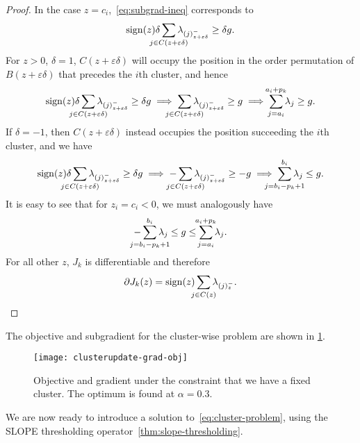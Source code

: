\begin{proof}
  In the case \(z = c_i\),~\eqref{eq:subgrad-ineq} corresponds to
  \begin{equation}
    \label{eq:subgrad-ineq-nonzero}
    \sign(z)\delta \smashoperator{\sum_{j \in C(z + \varepsilon\delta)}} \lambda_{(j)^-_{z + \varepsilon\delta}} \geq \delta g.
  \end{equation}
  For \(z > 0\), \(\delta = 1\), \(C(z + \varepsilon\delta)\) will occupy the position
  in the order permutation of \(B(z + \varepsilon\delta)\) that precedes the \(i\)th
  cluster, and hence
  \begin{equation*}
    \sign(z)\delta \smashoperator{\sum_{j \in C(z + \varepsilon\delta)}} \lambda_{(j)^-_{z + \varepsilon\delta}} \geq \delta g
    \implies
    \smashoperator{\sum_{j \in C(z + \varepsilon\delta)}} \lambda_{(j)^-_{z + \varepsilon\delta}} \geq g \implies
    \smashoperator{\sum_{j = a_i}^{a_i + p_k}} \lambda_j \geq g.
  \end{equation*}
  If \(\delta = -1\), then \(C(z + \varepsilon\delta)\) instead occupies the
  position succeeding the \(i\)th cluster, and we have
  \begin{equation*}
    \sign(z)\delta \smashoperator{\sum_{j \in C(z + \varepsilon\delta)}} \lambda_{(j)^-_{z + \varepsilon\delta}} \geq \delta g
    \implies
    -\smashoperator{\sum_{j \in C(z + \varepsilon\delta)}} \lambda_{(j)^-_{z + \varepsilon\delta}} \geq -g \implies
    \smashoperator{\sum_{j = b_i - p_k + 1}^{b_i}} \lambda_j \leq g.
  \end{equation*}
  It is easy to see that for \(z_i = c_i < 0\), we must analogously have
  \[
    -\smashoperator{\sum_{j = b_i - p_k + 1}^{b_i}} \lambda_j
    \leq g \leq
    \smashoperator{\sum_{j = a_i}^{a_i + p_k}} \lambda_j.
  \]
  For all other \(z\), \(J_k\) is differentiable and therefore
  \[
    \partial J_k(z) = \sign(z) \smashoperator{\sum_{j \in C(z)}} \lambda_{(j)^-_z}.
  \]
\end{proof}

The objective and subgradient for the cluster-wise problem are shown in
\cref{fig:cluster-grad-obj}.

\begin{figure}[htbp]
  \centering
  \texttt{[image: clusterupdate-grad-obj]}
  \caption{%
    Objective and gradient under the constraint that we have a fixed
    cluster.
    The optimum is found at \(\alpha = 0.3\).
  }%
  \label{fig:cluster-grad-obj}
\end{figure}

We are now ready to introduce a solution to~\eqref{eq:cluster-problem}, using
the SLOPE thresholding operator~\cref{thm:slope-thresholding}.

